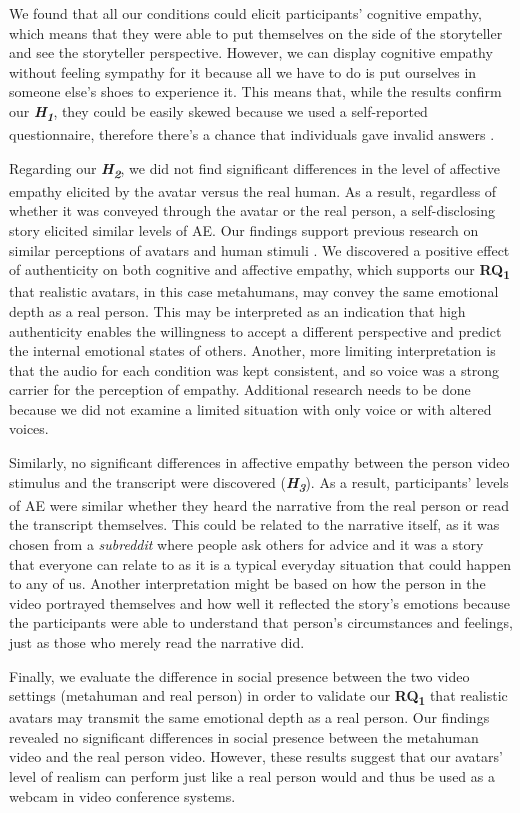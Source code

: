 We found that all our conditions could elicit participants' cognitive empathy, which means that they were able to put themselves on the side of the storyteller and see the storyteller perspective. However, we can display cognitive empathy without feeling sympathy for it because all we have to do is put ourselves in someone else's shoes to experience it.
This means that, while the results confirm our \textbf{\textit{H\textsubscript{1}}}, they could be easily skewed because we used a self-reported questionnaire, therefore there's a chance that individuals gave invalid answers \cite{DEM15}.

Regarding our \textbf{\textit{H\textsubscript{2}}}, we did not find significant differences in the level of affective empathy elicited by the avatar versus the real human. As a result, regardless of whether it was conveyed through the avatar or the real person, a self-disclosing story elicited similar levels of AE. Our findings support previous research on similar perceptions of avatars and human stimuli \cite{ALI15, ROT19}. We discovered a positive effect of authenticity on both cognitive and affective empathy, which supports our \textbf{RQ\textsubscript{1}} that realistic avatars, in this case metahumans, may convey the same emotional depth as a real person. This may be interpreted as an indication that high authenticity enables the willingness to accept a different perspective and predict the internal emotional states of others. Another, more limiting interpretation is that the audio for each condition was kept consistent, and so voice was a strong carrier for the perception of empathy. Additional research needs to be done because we did not examine a limited situation with only voice or with altered voices.

Similarly, no significant differences in affective empathy between the person video stimulus and the transcript were discovered (\textbf{\textit{H\textsubscript{3}}}). As a result, participants' levels of AE were similar whether they heard the narrative from the real person or read the transcript themselves. This could be related to the narrative itself, as it was chosen from a \textit{subreddit} where people ask others for advice and it was a story that everyone can relate to as it is a typical everyday situation that could happen to any of us. Another interpretation might be based on how the person in the video portrayed themselves and how well it reflected the story's emotions because the participants were able to understand that person's circumstances and feelings, just as those who merely read the narrative did.

Finally, we evaluate the difference in social presence between the two video settings (metahuman and real person) in order to validate our \textbf{RQ\textsubscript{1}} that realistic avatars may transmit the same emotional depth as a real person. Our findings revealed no significant differences in social presence between the metahuman video and the real person video. However, these results suggest that our avatars' level of realism can perform just like a real person would and thus be used as a webcam in video conference systems.